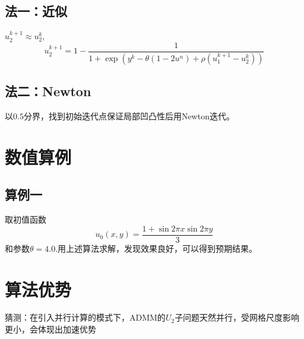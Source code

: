 \documentclass[11pt,a4 paper,one side]{article}
\begin{document}
\subsection{法一：近似}
$u_2^{k+1} \approx u_2^k$,\begin{equation}
    u_2^{k+1} = 1 - \frac{1}{1+\exp{ (y^k-\theta (1-2u^n)+\rho (u_1^{k+1}-u_2^k))}}
\end{equation}
\subsection{法二：Newton}
以$0.5$分界，找到初始迭代点保证局部凹凸性后用Newton迭代。
\section{数值算例}
\subsection{算例一}取初值函数\begin{equation}
u_0(x,y)=\frac{1+\sin{2\pi x}\sin {2\pi y}}{3}
\end{equation}
和参数$\theta = 4.0$.用上述算法求解，发现效果良好，可以得到预期结果。
\section{算法优势}
猜测：在引入并行计算的模式下，ADMM的$U_2$子问题天然并行，受网格尺度影响更小，会体现出加速优势
\end{document}
